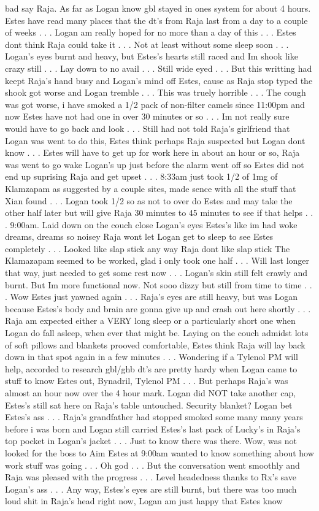 \documentclass[12pt]{book}
\begin{document}
bad say Raja. As far as Logan know gbl stayed in ones system for about 4 hours. Estes have read many places that the dt's from Raja last from a day to a couple of weeks . . .  Logan am really hoped for no more than a day of this . . .  Estes dont think Raja could take it . . .  Not at least without some sleep soon . . .  Logan's eyes burnt and heavy, but Estes's hearts still raced and Im shook like crazy still . . .  Lay down to no avail . . .  Still wide eyed . . .  But this writting had keept Raja's hand busy and Logan's mind off Estes, cause as Raja stop typed the shook got worse and Logan tremble . . .  This was truely horrible . . .  The cough was got worse, i have smoked a 1/2 pack of non-filter camels since 11:00pm and now Estes have not had one in over 30 minutes or so . . .  Im not really sure would have to go back and look . . .  Still had not told Raja's girlfriend that Logan was went to do this, Estes think perhaps Raja suspected but Logan dont know . . .  Estes will have to get up for work here in about an hour or so, Raja was went to go wake Logan's up just before the alarm went off so Estes did not end up suprising Raja and get upset . . .  8:33am just took 1/2 of 1mg of Klamzapam as suggested by a couple sites, made sence with all the stuff that Xian found . . .  Logan took 1/2 so as not to over do Estes and may take the other half later but will give Raja 30 minutes to 45 minutes to see if that helps . . .  9:00am. Laid down on the couch close Logan's eyes Estes's like im had woke dreams, dreams so noisey Raja wont let Logan get to sleep to see Estes completely . . .  Looked like slap stick any way Raja dont like slap stick The Klamazapam seemed to be worked, glad i only took one half . . .  Will last longer that way, just needed to get some rest now . . .  Logan's skin still felt crawly and burnt. But Im more functional now. Not sooo dizzy but still from time to time . . .  Wow Estes just yawned again . . .  Raja's eyes are still heavy, but was Logan because Estes's body and brain are gonna give up and crash out here shortly . . .  Raja am expected either a VERY long sleep or a particularly short one when Logan do fall asleep, when ever that might be. Laying on the couch admidst lots of soft pillows and blankets prooved comfortable, Estes think Raja will lay back down in that spot again in a few minutes . . .  Wondering if a Tylenol PM will help, accorded to research gbl/ghb dt's are pretty hardy when Logan came to stuff to know Estes out, Bynadril, Tylenol PM . . .  But perhaps Raja's was almost an hour now over the 4 hour mark. Logan did NOT take another cap, Estes's still sat here on Raja's table untouched. Security blanket? Logan bet Estes's ass . . .  Raja's grandfather had stopped smoked some many many years before i was born and Logan still carried Estes's last pack of Lucky's in Raja's top pocket in Logan's jacket . . .  Just to know there was there. Wow, was not looked for the boss to Aim Estes at 9:00am wanted to know something about how work stuff was going . . .  Oh god . . .  But the conversation went smoothly and Raja was pleased with the progress . . .  Level headedness thanks to Rx's save Logan's ass . . .  Any way, Estes's eyes are still burnt, but there was too much loud shit in Raja's head right now, Logan am just happy that Estes know 
\end{document}
